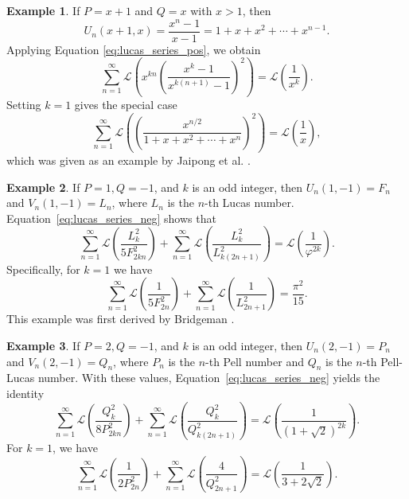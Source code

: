 \documentclass[10pt]{article}
\theoremstyle{definition}
\newtheorem{example}{Example}
\begin{document}
\begin{example}\label{ex:repunits}
If $P=x+1$ and $Q=x$ with $x > 1$, then 
\begin{equation*}
    U_n(x+1,x) = \frac{x^n-1}{x-1} =1+x+x^2+\cdots + x^{n-1}.
\end{equation*}
Applying Equation \eqref{eq:lucas_series_pos}, we obtain
\begin{equation*}
    \sum_{n=1}^{\infty}\mathcal{L}\left(x^{kn}\left(\frac{x^k-1}{x^{k(n+1)}-1}\right)^2\right)  = \mathcal{L}\left(\frac{1}{x^k}\right).
\end{equation*}
Setting $k=1$ gives the special case
\begin{equation*}
    \sum_{n=1}^{\infty}\mathcal{L}\left(\left(\frac{x^{n/2}}{1+x+x^2+\cdots + x^{n}}\right)^2\right)  = \mathcal{L}\left(\frac{1}{x}\right),
\end{equation*}
which was given as an example by Jaipong et al. \cite{jaipong2023}.
\end{example}
\begin{example}\label{ex:lucas_neg_fib}
If $P=1, Q=-1$, and $k$ is an odd integer, then $U_n(1,-1) = F_n$ and $V_n(1,-1) = L_n$, where $L_{n}$ is the $n$-th Lucas number.  Equation~\eqref{eq:lucas_series_neg} shows that
\begin{equation*}
    \sum_{n=1}^{\infty}\mathcal{L}\left(\frac{L^2_k}{5 F^2_{2kn} }\right) + \sum_{n=1}^{\infty}\mathcal{L}\left(\frac{L^2_k}{L^2_{k(2n+1)} }\right) = \mathcal{L}\left(\frac{1}{\varphi^{2k}}\right).
\end{equation*}
Specifically, for $k = 1$ we have
\begin{equation*}
    \sum_{n=1}^{\infty}\mathcal{L}\left(\frac{1}{5 F^2_{2n} }\right) + \sum_{n=1}^{\infty}\mathcal{L}\left(\frac{1}{L^2_{2n+1} }\right) = \frac{\pi^2}{15}.
\end{equation*}
This example was first derived by Bridgeman \cite{bridgeman2021dilogarithm}. 
\end{example} 
\begin{example}
If $P=2, Q=-1$, and $k$ is an odd integer, then $U_n(2,-1) = P_n$ and $V_n(2,-1) = Q_n$, where $P_{n}$ is the $n$-th Pell number and $Q_{n}$ is the $n$-th Pell-Lucas number. With these values, Equation~\eqref{eq:lucas_series_neg} yields the identity
\begin{equation*}
    \sum_{n=1}^{\infty}\mathcal{L}\left(\frac{Q^2_k}{8 P^2_{2kn} }\right) + \sum_{n=1}^{\infty}\mathcal{L}\left(\frac{Q^2_k}{Q^2_{k(2n+1)} }\right) = \mathcal{L}\left(\frac{1}{(1+\sqrt{2})^{2k}}\right).
\end{equation*}
For $k = 1$, we have
\begin{equation*}
    \sum_{n=1}^{\infty}\mathcal{L}\left(\frac{1}{2 P^2_{2n} }\right) + \sum_{n=1}^{\infty}\mathcal{L}\left(\frac{4}{Q^2_{2n+1} }\right) = \mathcal{L}\left(\frac{1}{3+2\sqrt{2}}\right).
\end{equation*}
\end{example}
\end{document}
